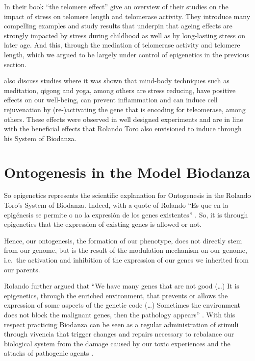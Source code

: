 \documentclass[
  11pt,
]{book}
\begin{document}
In their book ``the telomere effect'' \citet{BlackburnEpel2017} give an overview of their studies on the impact of stress on telomere length and telomerase activity.
They introduce many compelling examples and study results that underpin that ageing effects are strongly impacted by stress during childhood as well as by long-lasting stress on later age. And this, through the mediation of telomerase activity and telomere length, which we argued to be largely under control of epigenetics in the previous section.

\citet{BlackburnEpel2017} also discuss studies where it was shown that mind-body techniques such as meditation, qigong and yoga, among others are stress reducing, have positive effects on our well-being, can prevent inflammation and can induce cell rejuvenation by (re-)activating the gene that is encoding for teleomerase, among others. These effects were observed in well designed experiments and are in line with the beneficial effects that Rolando Toro also envisioned to induce through his System of Biodanza.

\hypertarget{ontogenesis-in-the-model-biodanza}{%
\section{Ontogenesis in the Model Biodanza}\label{ontogenesis-in-the-model-biodanza}}

So epigenetics represents the scientific explanation for Ontogenesis in the Rolando Toro's System of Biodanza. Indeed, with a quote of Rolando ``Es que en la epigénesis
se permite o no la expresión de los genes existentes'' \citep{Montanari2023}. So, it is through epigenetics that the expression of existing genes is allowed or not.

Hence, our ontogenesis, the formation of our phenotype, does not directly stem from our genome, but is the result of the modulation mechanism on our genome, i.e.~the activation and inhibition of the expression of our genes we inherited from our parents.

Rolando further argued that ``We have many genes that are not good (\ldots) It is epigenetics, through the enriched environment, that prevents or allows the expression of some aspects of the genetic code (\ldots) Sometimes the environment does not block the malignant genes, then the pathology appears'' \citep{Montanari2023}. With this respect practicing Biodanza can be seen as a regular administration of stimuli through vivencia that trigger changes and repairs necessary to rebalance our biological system from the damage caused by our toxic experiences and the attacks of pathogenic agents \citep{Montanari2023}.
\end{document}
